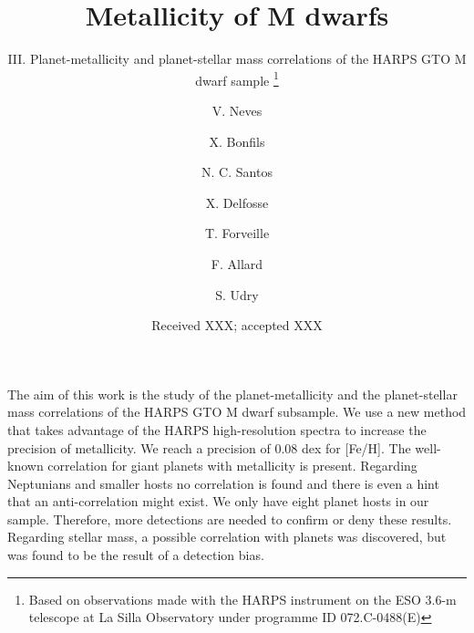 \documentclass[structabstract]{aa}
\begin{document}
%
   \title{Metallicity of M dwarfs}

   \subtitle{III. Planet-metallicity and planet-stellar mass correlations of the HARPS GTO M dwarf sample \thanks{Based on observations made with the HARPS instrument on the ESO 3.6-m telescope at La Silla Observatory under programme ID 072.C-0488(E)
   }}

\author{ V. Neves \and X. Bonfils \and
  N. C. Santos \and X. Delfosse \and
  T. Forveille  \and F. Allard  \and
  S. Udry}


   \date{Received XXX; accepted XXX}

 
  \abstract
   {}
   { The aim of this work is the study of the planet-metallicity and the planet-stellar mass correlations of the HARPS GTO M dwarf subsample.}
   { We use a new method that takes advantage of the HARPS high-resolution spectra to increase the precision of metallicity. We reach a precision of 0.08 dex for [Fe/H].}
   {The well-known correlation for giant planets with metallicity is present. Regarding Neptunians and smaller hosts no correlation is found and there is even a hint that an anti-correlation might exist. We only have eight planet hosts in our sample. Therefore, more detections are needed to confirm or deny these results. Regarding stellar mass, a possible correlation with planets was discovered, but was found to be the result of a detection bias.}
   {}
\end{document}
